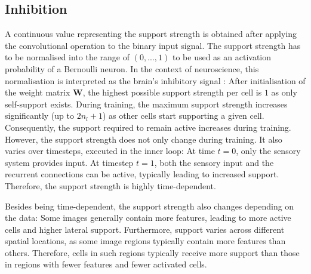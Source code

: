 \subsection{Inhibition}
A continuous value representing the support strength is obtained after applying the convolutional operation to the binary input signal.
The support strength has to be normalised into the range of $(0, ..., 1)$ to be used as an activation probability of a Bernoulli neuron.
In the context of neuroscience, this normalisation is interpreted as the brain's inhibitory signal :
After initialisation of the weight matrix $\boldsymbol{W}$, the highest possible support strength per cell is $1$ as only self-support exists. During training, the maximum support strength increases significantly (up to $2n_l + 1$) as other cells start supporting a given cell.
Consequently, the support required to remain active increases during training.
However, the support strength does not only change during training. It also varies over timesteps, executed in the inner loop: At time $t=0$, only the sensory system provides input. At timestep $t=1$, both the sensory input and the recurrent connections can be active, typically leading to increased support. Therefore, the support strength is highly time-dependent.

Besides being time-dependent, the support strength also changes depending on the data:
Some images generally contain more features, leading to more active cells and higher lateral support. Furthermore, support varies across different spatial locations, as some image regions typically contain more features than others. Therefore, cells in such regions typically receive more support than those in regions with fewer features and fewer activated cells.

